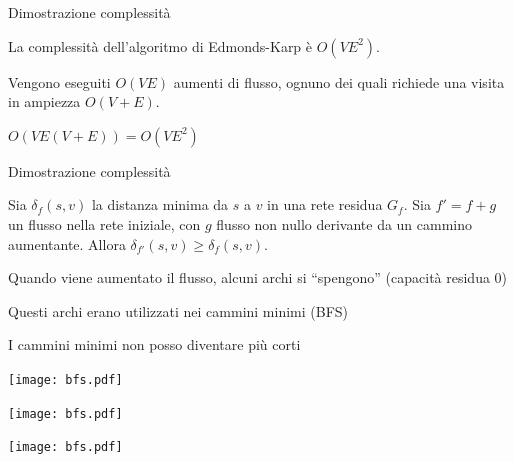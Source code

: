 \begin{frame}{Dimostrazione complessità}

\vspace{-9pt}
\begin{myboxtitle}[Teorema]
La complessità dell'algoritmo di Edmonds-Karp è $O(VE^2)$.
\end{myboxtitle}
\BIL
\item Vengono eseguiti $O(VE)$ aumenti di flusso, ognuno dei quali richiede
una visita in ampiezza $O(V+E)$.
\item $O(VE(V+E)) = O(VE^2)$
\EIL


\end{frame}

\begin{frame}{Dimostrazione complessità}

\vspace{-9pt}
\begin{myboxtitle}
Sia $\delta_f(s,v)$ la distanza minima da $s$ a $v$ in una rete residua $G_f$.
Sia $f' = f+g$ un flusso nella rete iniziale, con $g$ flusso non nullo derivante
da un cammino aumentante. Allora $\delta_{f'}(s,v) \geq \delta_f(s,v)$.
\end{myboxtitle}  
\BI
  \item Quando viene aumentato il flusso, alcuni archi si  ``spengono'' (capacità residua 0)
  \item Questi archi erano utilizzati nei cammini minimi (BFS)
  \item I cammini minimi non posso diventare più corti
\EI

\begin{overprint}
\begin{center}
\texttt{[image: bfs.pdf]}
\end{center}
\begin{center}
\texttt{[image: bfs.pdf]}
\end{center}
\begin{center}
\texttt{[image: bfs.pdf]}
\end{center}
\end{overprint}

\end{frame}

